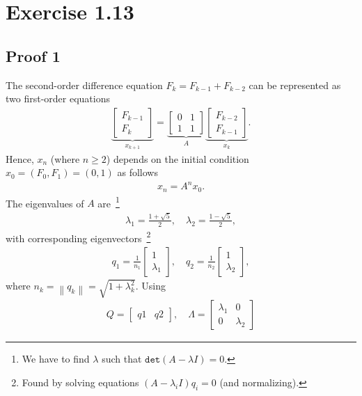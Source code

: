 \documentclass[12pt,a4paper]{article}
\newcommand{\norm}[1]{\left\lVert#1\right\rVert}
\newcommand\cc[1]{\texttt{#1}}
\begin{document}
\section{Exercise 1.13}

\subsection{Proof 1}

The second-order difference equation $F_k = F_{k-1} + F_{k-2}$ can be represented as two
first-order equations
\begin{align*}
  \underbrace{\begin{bmatrix} F_{k-1} \\ F_k \end{bmatrix}}_{x_{k+1}} =
  \underbrace{\begin{bmatrix} 0 & 1 \\ 1 & 1 \end{bmatrix}}_{A}
  \underbrace{\begin{bmatrix} F_{k-2} \\ F_{k-1} \end{bmatrix}}_{x_k}.
\end{align*}
Hence, $x_{n}$ (where $n \geq 2$) depends on the initial condition $x_0 = (F_0, F_1) = (0, 1)$ as follows
\begin{align} \label{eq.initial-condition}
  x_n = A^nx_0.
\end{align}
The eigenvalues of $A$ are~\footnote{We have to find $\lambda$ such that $\cc{det}(A - \lambda I) = 0$.}
\begin{align*}
  \lambda_1 = \frac{1 + \sqrt{5}}{2}, \quad \lambda_2 = \frac{1 - \sqrt{5}}{2},
\end{align*}
with corresponding eigenvectors~\footnote{Found by solving equations $(A - \lambda_i
I)q_i = 0$ (and normalizing).}
\begin{align*}
  q_1 = \frac{1}{n_1}\begin{bmatrix} 1 \\ \lambda_1 \end{bmatrix}, \quad
  q_2 = \frac{1}{n_2}\begin{bmatrix} 1 \\ \lambda_2 \end{bmatrix},
\end{align*}
where $n_k = \norm{q_k} = \sqrt{1 + \lambda_k^2}$. Using
\begin{align*}
  Q = \begin{bmatrix}q1 & q2\end{bmatrix}, \quad
    \Lambda = \begin{bmatrix} \lambda_1 & 0 \\ 0 & \lambda_2 \end{bmatrix}
\end{align*}
\end{document}
